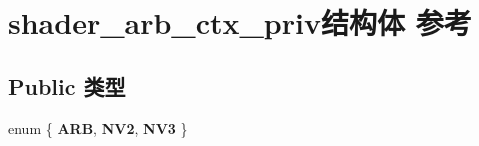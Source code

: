 \hypertarget{structshader__arb__ctx__priv}{}\section{shader\+\_\+arb\+\_\+ctx\+\_\+priv结构体 参考}
\label{structshader__arb__ctx__priv}
\subsection*{Public 类型}
\begin{DoxyCompactItemize}
\item 
\mbox{\label{structshader__arb__ctx__priv_af6d5fc06ca4742ad2c61a5b7fd7c585b}} 
enum \{ {\bfseries A\+RB}, 
{\bfseries N\+V2}, 
{\bfseries N\+V3}
 \}
\end{DoxyCompactItemize}
